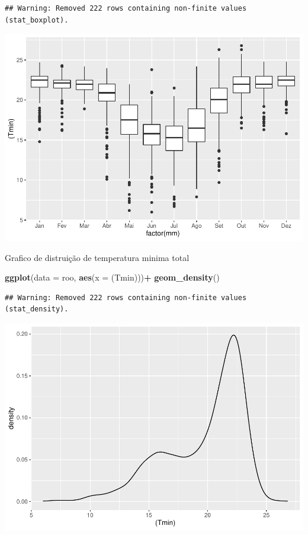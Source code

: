 \documentclass[
]{book}
\newenvironment{Shaded}{\begin{snugshade}}{\end{snugshade}}
\newcommand{\DataTypeTok}[1]{\textcolor[rgb]{0.13,0.29,0.53}{#1}}
\newcommand{\KeywordTok}[1]{\textcolor[rgb]{0.13,0.29,0.53}{\textbf{#1}}}
\newcommand{\NormalTok}[1]{#1}
\newcommand{\OperatorTok}[1]{\textcolor[rgb]{0.81,0.36,0.00}{\textbf{#1}}}
\newcommand{\StringTok}[1]{\textcolor[rgb]{0.31,0.60,0.02}{#1}}
\begin{document}
\begin{verbatim}
## Warning: Removed 222 rows containing non-finite values (stat_boxplot).
\end{verbatim}

\includegraphics{TudodoR_files/figure-latex/unnamed-chunk-241-1.pdf}

Grafico de distruição de temperatura minima total

\begin{Shaded}
\begin{Highlighting}[]
\KeywordTok{ggplot}\NormalTok{(}\DataTypeTok{data =}\NormalTok{ roo, }\KeywordTok{aes}\NormalTok{(}\DataTypeTok{x =}\NormalTok{ (Tmin)))}\OperatorTok{+}
\StringTok{  }\KeywordTok{geom_density}\NormalTok{()}
\end{Highlighting}
\end{Shaded}

\begin{verbatim}
## Warning: Removed 222 rows containing non-finite values (stat_density).
\end{verbatim}

\includegraphics{TudodoR_files/figure-latex/unnamed-chunk-242-1.pdf}
\end{document}
